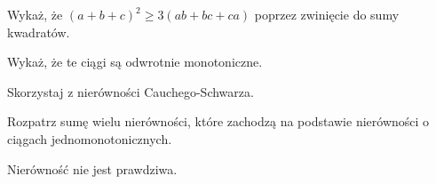 
\begin{hints_list}
	\item Wykaż, że $(a + b + c)^2 \geqslant 3(ab + bc + ca)$ poprzez zwinięcie do sumy kwadratów.
	\item Wykaż, że te ciągi są odwrotnie monotoniczne.
	\item Skorzystaj z nierówności Cauchego-Schwarza.
	\item Rozpatrz sumę wielu nierówności, które zachodzą na podstawie nierówności o ciągach jednomonotonicznych.
	\item Nierówność nie jest prawdziwa.
\end{hints_list}